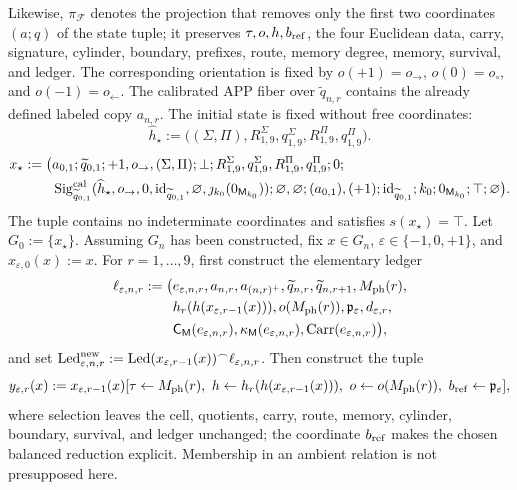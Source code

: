 Likewise, \(\pi_{\mathcal F}\) denotes the projection that removes only the
first two coordinates \((a;q)\) of the state tuple; it preserves
\(\tau,o,h,b_{\rm ref}\), the four Euclidean data, carry, signature, cylinder,
boundary, prefixes, route, memory degree, memory, survival, and ledger. The
corresponding orientation is fixed by
\(o(+1)=o_{\rightarrow}\), \(o(0)=o_{\circ}\), and
\(o(-1)=o_{\leftarrow}\).
The calibrated APP fiber over \(\widetilde q_{n,r}\) contains the already
defined labeled copy \(a_{n,r}\). The initial state is fixed without free
coordinates:
\[
 \widehat h_\star:=
 \bigl((\Sigma,\Pi),R^\Sigma_{1,9},q^\Sigma_{1,9},
       R^\Pi_{1,9},q^\Pi_{1,9}\bigr).
\]
\begin{equation}
\begin{aligned}
 x_\star:=\bigl(&a_{0,1};\widetilde q_{0,1};
 +1,o_{\rightarrow},(\Sigma,\Pi);\bot;
 R^\Sigma_{1,9},q^\Sigma_{1,9},R^\Pi_{1,9},q^\Pi_{1,9};0;\\
 &\operatorname{Sig}^{\rm cal}_{\widetilde q_{0,1}}
       (\widehat h_\star,o_{\rightarrow},0,
        \operatorname{id}_{\widetilde q_{0,1}},\varnothing,
        \jmath_{k_0}(0_{\mathsf M_{k_0}}));
 \varnothing,\varnothing;
 (a_{0,1}),(+1);\operatorname{id}_{\widetilde q_{0,1}};
 k_0;0_{\mathsf M_{k_0}};\top;\varnothing\bigr).
\end{aligned}
\label{hmtfg:eq:estado-inicial-calibrado-ch}
\end{equation}
The tuple contains no indeterminate coordinates and satisfies
\(s(x_\star)=\top\). Let \(G_0:=\{x_\star\}\). Assuming \(G_n\) has been
constructed, fix \(x\in G_n\), \(\varepsilon\in\{-1,0,+1\}\), and
\(x_{\varepsilon,0}(x):=x\). For \(r=1,\ldots,9\), first construct the
elementary ledger
\begin{equation}
\begin{aligned}
 \ell_{\varepsilon,n,r}:=\bigl(&e_{\varepsilon,n,r},a_{n,r},a_{(n,r)^+},
 \widetilde q_{n,r},\widetilde q_{n,r+1},M_{\rm ph}(r),\\
 &h_r(h(x_{\varepsilon,r-1}(x))),o(M_{\rm ph}(r)),\mathfrak p_\varepsilon,
 d_{\varepsilon,r},\\
 &\mathsf C_{\mathsf M}(e_{\varepsilon,n,r}),
 \kappa_{\mathsf M}(e_{\varepsilon,n,r}),
 \operatorname{Carr}(e_{\varepsilon,n,r})\bigr),
\end{aligned}
 \label{hmtfg:eq:registro-elemental-ext-ch}
\end{equation}
and set
\(\operatorname{Led}^{\rm new}_{\varepsilon,n,r}:=
\operatorname{Led}(x_{\varepsilon,r-1}(x))^\frown
\ell_{\varepsilon,n,r}\). Then construct the tuple
\begin{equation}
 y_{\varepsilon,r}(x):=
 x_{\varepsilon,r-1}(x)
 [\tau\leftarrow M_{\rm ph}(r),\
  h\leftarrow h_r(h(x_{\varepsilon,r-1}(x))),\
  o\leftarrow o(M_{\rm ph}(r)),\
  b_{\rm ref}\leftarrow\mathfrak p_\varepsilon],
 \label{hmtfg:eq:tupla-sel-cal-ch}
\end{equation}
where selection leaves the cell, quotients, carry, route, memory, cylinder,
boundary, survival, and ledger unchanged; the coordinate \(b_{\rm ref}\)
makes the chosen balanced reduction explicit. Membership in an ambient
relation is not presupposed here.

